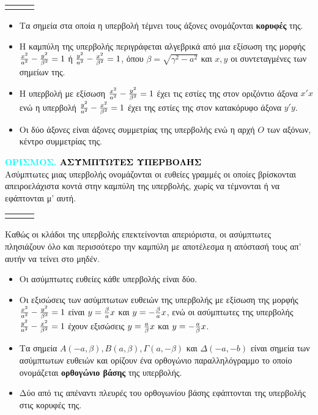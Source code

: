 \documentclass[twoside,10pt]{book}
\newcounter{orismos}[chapter]
\renewcommand{\theorismos}{\thechapter.\arabic{orismos}}
\newcommand{\Orismos}[1]{\refstepcounter{orismos}\textcolor{cyan}{\textbf{ΟΡΙΣΜΟΣ\hspace{2mm}\theorismos\hspace{1mm} \textcolor{black}{\MakeUppercase{#1}}}}\\}{}
\DeclareRobustCommand{\frac}[3][0pt]{%
{\begingroup\hspace{#1}#2\hspace{#1}\endgroup\over\hspace{#1}#3\hspace{#1}}}
\begin{document}
\begin{center}
\begin{tabular}{p{4.5cm}cp{4.5cm}}
 & \hspace{1cm} &  \\ 
\end{tabular}
\end{center}
\begin{itemize}
\item Τα σημεία στα οποία η υπερβολή τέμνει τους άξονες ονομάζονται \textbf{κορυφές} της.
\item Η καμπύλη της υπερβολής περιγράφεται αλγεβρικά από μια εξίσωση της μορφής $\frac{x^2}{a^2}-\frac{y^2}{\beta^2}=1$ ή $\frac{y^2}{a^2}-\frac{x^2}{\beta^2}=1$, όπου $ \beta=\sqrt{\gamma^2-a^2} $ και $ x,y $ οι συντεταγμένες των σημείων της.
\item Η υπερβολή με εξίσωση $\frac{x^2}{a^2}-\frac{y^2}{\beta^2}=1$ έχει τις εστίες της στον οριζόντιο άξονα $ x'x $ ενώ η υπερβολή $\frac{y^2}{a^2}-\frac{x^2}{\beta^2}=1$ έχει της εστίες της στον κατακόρυφο άξονα $ y'y $.
\item Οι δύο άξονες είναι άξονες συμμετρίας της υπερβολής ενώ η αρχή $ O $ των αξόνων, κέντρο συμμετρίας της.
\end{itemize}
\Orismos{Ασύμπτωτεσ υπερβολήσ}
Ασύμπτωτες μιας υπερβολής ονομάζονται οι ευθείες γραμμές οι οποίες βρίσκονται απειροελάχιστα κοντά στην καμπύλη της υπερβολής, χωρίς να τέμνονται ή να εφάπτονται μ' αυτή.
\begin{center}
\begin{tabular}{p{4.5cm}cp{4.5cm}}
 & \hspace{.5cm} &  \\ 
\end{tabular}
\end{center}
Καθώς οι κλάδοι της υπερβολής επεκτείνονται απεριόριστα, οι ασύμπτωτες πλησιάζουν όλο και περισσότερο την καμπύλη με αποτέλεσμα η απόστασή τους απ' αυτήν να τείνει στο μηδέν.
\begin{itemize}
\item Οι ασύμπτωτες ευθείες κάθε υπερβολής είναι δύο.
\item Οι εξισώσεις των ασύμπτωτων ευθειών της υπερβολής με εξίσωση της μορφής $ \frac{x^2}{a^2}-\frac{y^2}{\beta^2}=1 $ είναι $ y=\frac{\beta}{a}x $ και $ y=-\frac{\beta}{a}x $, ενώ οι ασύμπτωτες της υπερβολής $ \frac{y^2}{a^2}-\frac{x^2}{\beta^2}=1 $ έχουν εξισώσεις $ y=\frac{a}{\beta}x $ και $ y=-\frac{a}{\beta}x $.
\item Τα σημεία $ A(-a,\beta), B(a,\beta), \varGamma(a,-\beta) $ και $ \varDelta(-a,-b) $ είναι σημεία των ασύμπτωτων ευθειών και ορίζουν ένα ορθογώνιο παραλληλόγραμμο το οποίο ονομάζεται \textbf{ορθογώνιο βάσης} της υπερβολής.
\item Δύο από τις απέναντι πλευρές του ορθογωνίου βάσης εφάπτονται της υπερβολής στις κορυφές της.
\end{itemize}
\end{document}
